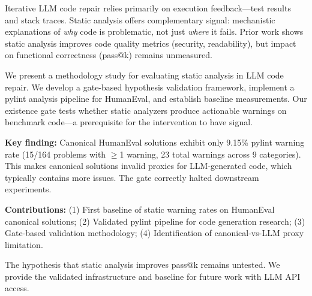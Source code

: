 Iterative LLM code repair relies primarily on execution feedback---test results and stack traces. Static analysis offers complementary signal: mechanistic explanations of \emph{why} code is problematic, not just \emph{where} it fails. Prior work shows static analysis improves code quality metrics (security, readability), but impact on functional correctness (pass@k) remains unmeasured.

We present a methodology study for evaluating static analysis in LLM code repair. We develop a gate-based hypothesis validation framework, implement a pylint analysis pipeline for HumanEval, and establish baseline measurements. Our existence gate tests whether static analyzers produce actionable warnings on benchmark code---a prerequisite for the intervention to have signal.

\textbf{Key finding:} Canonical HumanEval solutions exhibit only 9.15\% pylint warning rate (15/164 problems with $\geq$1 warning, 23 total warnings across 9 categories). This makes canonical solutions invalid proxies for LLM-generated code, which typically contains more issues. The gate correctly halted downstream experiments.

\textbf{Contributions:} (1) First baseline of static warning rates on HumanEval canonical solutions; (2) Validated pylint pipeline for code generation research; (3) Gate-based validation methodology; (4) Identification of canonical-vs-LLM proxy limitation.

The hypothesis that static analysis improves pass@k remains untested. We provide the validated infrastructure and baseline for future work with LLM API access.
